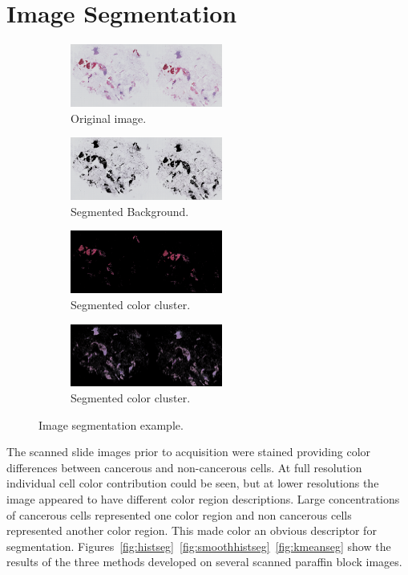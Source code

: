 \documentclass[letterpaper,10pt,oneside]{article}
\begin{document}

\section{Image Segmentation}
\begin{figure}[hbpt]
  \centering
  \begin{subfigure}{5cm}
    \includegraphics[width=5cm]{images/PO13-00516A1_1_7_201305171148_half.png}
    \caption{Original image.}
  \end{subfigure}
  \begin{subfigure}{5cm}
    \includegraphics[width=5cm]{images/PO13-00516A1_1_7_201305171148_cluster_1.png}
    \caption{Segmented Background.}
  \end{subfigure}
  \begin{subfigure}{5cm}
    \includegraphics[width=5cm]{images/PO13-00516A1_1_7_201305171148_cluster_2.png}
    \caption{Segmented color cluster.}
  \end{subfigure}
  \begin{subfigure}{5cm}
    \includegraphics[width=5cm]{images/PO13-00516A1_1_7_201305171148_cluster_3.png}
    \caption{Segmented color cluster.}
  \end{subfigure}
  \caption{Image segmentation example.}
  \label{fig:segexample}
\end{figure}
The scanned slide images prior to acquisition were stained providing color differences between cancerous and non-cancerous cells. At full resolution individual cell color contribution could be seen, but at lower resolutions the image appeared to have different color region descriptions. Large concentrations of cancerous cells represented one color region and non cancerous cells represented another color region. This made color an obvious descriptor for segmentation. Figures~\ref{fig:histseg}~\ref{fig:smoothhistseg}~\ref{fig:kmeanseg} show the results of the three methods developed on several scanned paraffin block images.
\end{document}
